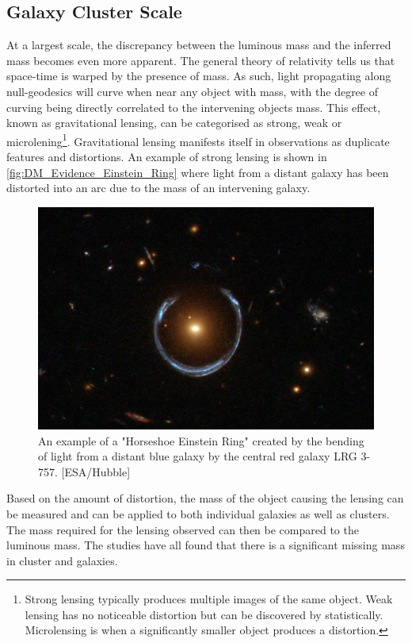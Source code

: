 \subsection{Galaxy Cluster Scale}
\par
At a largest scale, the discrepancy between the luminous mass and the inferred mass becomes even more apparent.
The general theory of relativity tells us that space-time is warped by the presence of mass.
As such, light propagating along null-geodesics will curve when near any object with mass, with the degree of curving being directly correlated to the intervening objects mass.
This effect, known as gravitational lensing, can be categorised as strong, weak or microlening\footnote{Strong lensing typically produces multiple images of the same object. Weak lensing has no noticeable distortion but can be discovered by statistically. Microlensing is when a significantly smaller object produces a distortion.}. 
Gravitational lensing manifests itself in observations as duplicate features and distortions.
An example of strong lensing is shown in \autoref{fig:DM_Evidence_Einstein_Ring} where light from a distant galaxy has been distorted into an arc due to the mass of an intervening galaxy.

\begin{figure}[!htbp]%
    \centering
    \includegraphics[scale=0.5]{Figures/DarkMatterEvidence/Einstein_Ring_from_Hubble.JPG}
    \caption{An example of a "Horseshoe Einstein Ring" created by the bending of light from a distant blue galaxy by the central red galaxy LRG 3-757. [ESA/Hubble]}
    \label{fig:DM_Evidence_Einstein_Ring}
\end{figure}

Based on the amount of distortion, the mass of the object causing the lensing can be measured and can be applied to both individual galaxies as well as clusters.
The mass required for the lensing observed can then be compared to the luminous mass.
The studies have all found that there is a significant missing mass in cluster and galaxies.

